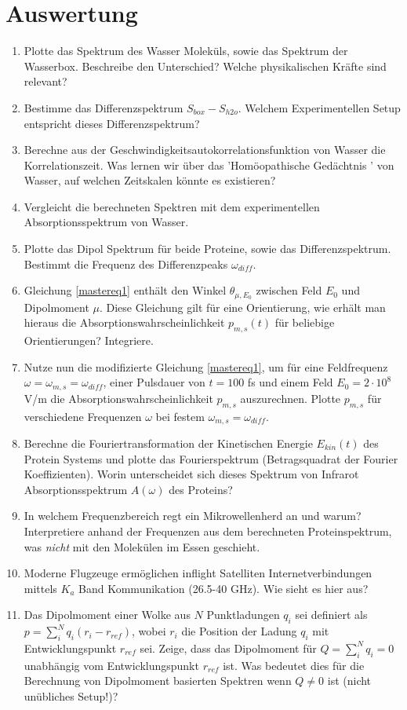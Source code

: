 \documentclass[a4paper,12pt]{article}
\begin{document}
\section*{Auswertung}
\begin{enumerate}
 \item Plotte das Spektrum des Wasser Moleküls, sowie das Spektrum der Wasserbox. Beschreibe den Unterschied? Welche physikalischen Kräfte sind relevant?
 \item Bestimme das Differenzspektrum $S_{box}-S_{h2o}$. Welchem Experimentellen Setup entspricht dieses Differenzspektrum?
 \item Berechne aus der Geschwindigkeitsautokorrelationsfunktion von Wasser die Korrelationszeit. Was lernen wir über das 'Homöopathische Gedächtnis ' von Wasser, auf welchen Zeitskalen könnte es existieren?
 \item Vergleicht die berechneten Spektren mit dem experimentellen Absorptionsspektrum von Wasser.

 \item Plotte das Dipol Spektrum für beide Proteine, sowie das Differenzspektrum. Bestimmt die Frequenz des Differenzpeaks $\omega_{diff}$.
 \item Gleichung \ref{mastereq1} enthält den Winkel $\theta_{\mu,E_0}$ zwischen Feld $E_0$ und Dipolmoment $\mu$. Diese Gleichung gilt für eine Orientierung, wie erhält man hieraus die Absorptionswahrscheinlichkeit
 $p_{m,s}(t)$ für beliebige Orientierungen? Integriere.
 \item Nutze nun die modifizierte Gleichung \ref{mastereq1}, um für eine Feldfrequenz $\omega=\omega_{m,s}=\omega_{diff}$, einer Pulsdauer von $t=100$ fs und einem Feld $E_0=2\cdot10^8$ V/m
 die Absorptionswahrscheinlichkeit $p_{m,s}$ auszurechnen. Plotte $p_{m,s}$ für verschiedene Frequenzen $\omega$ bei festem $\omega_{m,s}=\omega_{diff}$.
 \item Berechne die Fouriertransformation der Kinetischen Energie $E_{kin}(t)$ des Protein Systems und plotte das Fourierspektrum (Betragsquadrat der Fourier Koeffizienten). Worin unterscheidet sich dieses
 Spektrum von Infrarot Absorptionsspektrum $A(\omega)$ des Proteins?
 
 \item In welchem Frequenzbereich regt ein Mikrowellenherd an und warum? Interpretiere anhand der Frequenzen aus dem berechneten Proteinspektrum, was \emph{nicht} mit den Molekülen im Essen geschieht. 
 \item Moderne Flugzeuge ermöglichen inflight Satelliten Internetverbindungen mittels $K_a$ Band Kommunikation (26.5-40 GHz). Wie sieht es hier aus?
 \item Das Dipolmoment einer Wolke aus $N$ Punktladungen $q_i$ sei definiert als $p=\sum_i^N q_i (r_i-r_{ref})$, wobei $r_i$ die Position der Ladung $q_i$
 mit Entwicklungspunkt $r_{ref}$ sei. Zeige, dass das Dipolmoment für $Q=\sum_i^N q_i=0$ unabhängig vom Entwicklungspunkt $r_{ref}$ ist. Was bedeutet dies für
 die Berechnung von Dipolmoment basierten Spektren wenn $Q\neq0$ ist (nicht unübliches Setup!)?
\end{enumerate}
\end{document}
